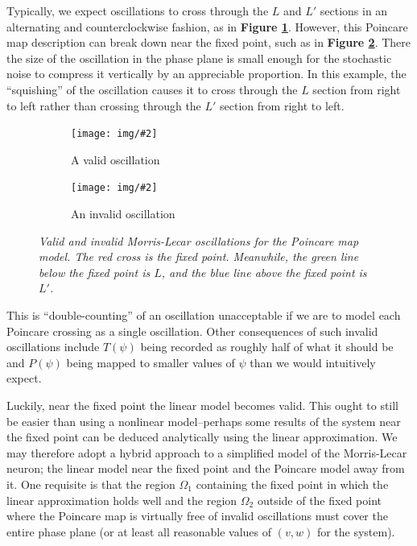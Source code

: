 \documentclass[letterpaper,12pt]{article}
\numberwithin{table}{section}
\numberwithin{figure}{section}
\numberwithin{equation}{section}
\newcommand{\centerfig}[2]{\begin{center}\texttt{[image: img/\#2]}\end{center}}
\newcommand{\ccaption}[1]{\caption{\textit{#1}}}
\newcommand{\reffig}[1]{\textbf{Figure \ref{#1}}}
\begin{document}
\begin{flushleft}
    Typically, we expect oscillations to cross through the $L$ and $L'$ sections in an alternating and counterclockwise fashion, as in \reffig{fig:valid}. However, this Poincare map description can break down near the fixed point, such as in \reffig{fig:invalid-l}. There the size of the oscillation in the phase plane is small enough for the stochastic noise to compress it vertically by an appreciable proportion. In this example, the ``squishing'' of the oscillation causes it to cross through the $L$ section from right to left rather than crossing through the $L'$ section from right to left.
    \begin{figure}[h]

        \centering
    
        \begin{subfigure}{0.49\textwidth}
            \centerfig{0.6}{valid.jpg}
            \caption{A valid oscillation}
            \label{fig:valid}
        \end{subfigure}
        \begin{subfigure}{0.49\textwidth}
            \centerfig{0.6}{invalid-l.jpg}
            \caption{An invalid oscillation}
            \label{fig:invalid-l}
        \end{subfigure}
    
        \captionsetup{width=0.8\linewidth}
        \ccaption{Valid and invalid Morris-Lecar oscillations for the Poincare map model. The red cross is the fixed point. Meanwhile, the green line below the fixed point is $L$, and the blue line above the fixed point is $L'$.}
        \label{fig:pmap-fail}
    
    \end{figure}
    This is ``double-counting'' of an oscillation unacceptable if we are to model each Poincare crossing as a single oscillation. Other consequences of such invalid oscillations include $T(\psi)$ being recorded as roughly half of what it should be and $P(\psi)$ being mapped to smaller values of $\psi$ than we would intuitively expect.

    Luckily, near the fixed point the linear model becomes valid. This ought to still be easier than using a nonlinear model--perhaps some results of the system near the fixed point can be deduced analytically using the linear approximation. We may therefore adopt a hybrid approach to a simplified model of the Morris-Lecar neuron; the linear model near the fixed point and the Poincare model away from it. One requisite is that the region $\Omega_1$ containing the fixed point in which the linear approximation holds well and the region $\Omega_2$ outside of the fixed point where the Poincare map is virtually free of invalid oscillations must cover the entire phase plane (or at least all reasonable values of $(v, w)$ for the system).


\end{flushleft}
\end{document}

